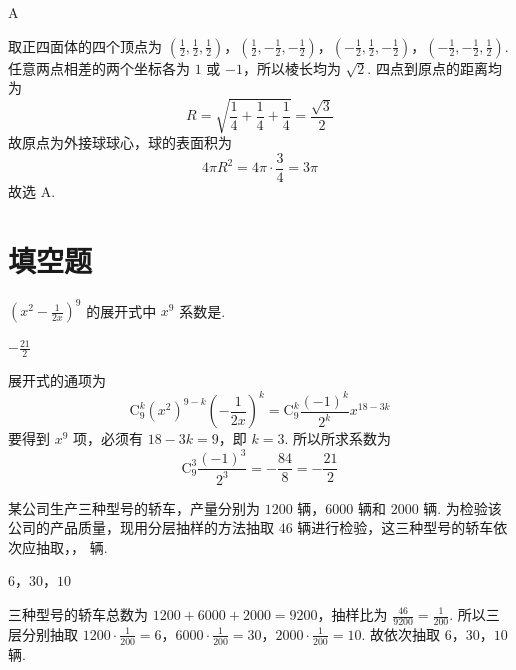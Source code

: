 \begin{answer}
A
\end{answer}

\begin{solution}
取正四面体的四个顶点为
\(\left(\frac12,\frac12,\frac12\right)\)，\(\left(\frac12,-\frac12,-\frac12\right)\)，\(\left(-\frac12,\frac12,-\frac12\right)\)，\(\left(-\frac12,-\frac12,\frac12\right)\).
任意两点相差的两个坐标各为 \(1\) 或 \(-1\)，所以棱长均为 \(\sqrt2\). 四点到原点的距离均为
\[
R=\sqrt{\frac14+\frac14+\frac14}=\frac{\sqrt3}{2}
\]
故原点为外接球球心，球的表面积为
\[
4\pi R^2=4\pi\cdot\frac34=3\pi
\]
故选 A.
\end{solution}

\section{填空题}
\begin{problem}
\(\left(x^{2} - \frac{1}{2x}\right)^{9}\) 的展开式中 \(x^{9}\) 系数是\fillinblank{}.
\end{problem}

\begin{answer}
\(-\frac{21}{2}\)
\end{answer}

\begin{solution}
展开式的通项为
\[
\mathrm C_9^k(x^2)^{9-k}\left(-\frac1{2x}\right)^k=\mathrm C_9^k\frac{(-1)^k}{2^k}x^{18-3k}
\]
要得到 \(x^9\) 项，必须有 \(18-3k=9\)，即 \(k=3\). 所以所求系数为
\[
\mathrm C_9^3\frac{(-1)^3}{2^3}=-\frac{84}{8}=-\frac{21}{2}
\]
\end{solution}

\begin{problem}
某公司生产三种型号的轿车，产量分别为 \(1200\text{ 辆}\)，\(6000\text{ 辆}\)和 \(2000\text{ 辆}\). 为检验该公司的产品质量，现用分层抽样的方法抽取 \(46\text{ 辆}\)进行检验，这三种型号的轿车依次应抽取\fillinblank{}，\fillinblank{}，\fillinblank{} \(\text{辆}\).
\end{problem}

\begin{answer}
\(6\)，\(30\)，\(10\)
\end{answer}

\begin{solution}
三种型号的轿车总数为 \(1200+6000+2000=9200\)，抽样比为 \(\frac{46}{9200}=\frac{1}{200}\). 所以三层分别抽取
\(1200\cdot\frac1{200}=6\)，\(6000\cdot\frac1{200}=30\)，\(2000\cdot\frac1{200}=10\).
故依次抽取 \(6\)，\(30\)，\(10\) 辆.
\end{solution}

